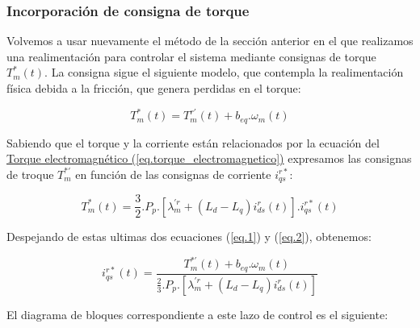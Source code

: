 \documentclass{article}
\begin{document}
\subsubsection{Incorporación de consigna de torque}

Volvemos a usar nuevamente el método de la sección anterior en el que realizamos una realimentación
para controlar el sistema mediante consignas de torque $T_m^*(t)$. La consigna sigue el siguiente modelo,
que contempla la realimentación física debida a la fricción, que genera perdidas en el torque:

\begin{equation}\label{eq.1}
    T_m^*(t) = T_m^{r\prime}(t) + b_{eq}.\omega_m(t)
\end{equation}

Sabiendo que el torque y la corriente están relacionados por la ecuación del
\hyperref[eq.torque_electromagnetico]{Torque electromagnético (\ref*{eq.torque_electromagnetico})}
expresamos las consignas de troque $T_m^{*\prime}$ en función de las consignas de corriente $i_{qs}^{r*}$:

\begin{equation}\label{eq.2}
    T_m^{*}(t) = \frac{3}{2}.P_p.[\lambda_m^{\prime r} + (L_d - L_q)i_{ds}^{r}(t)].i_{qs}^{r*}(t)
\end{equation}

Despejando de estas ultimas dos ecuaciones (\ref{eq.1}) y (\ref{eq.2}), obtenemos:

\begin{equation}
    i_{qs}^{r*}(t) = \frac{T_m^{*\prime}(t) + b_{eq}.\omega_m(t)}{\frac{2}{3}.P_p.[\lambda_m^{\prime r} + (L_d - L_q)i_{ds}^{r}(t)]}
\end{equation}


El diagrama de bloques correspondiente a este lazo de control es el siguiente:
\end{document}

